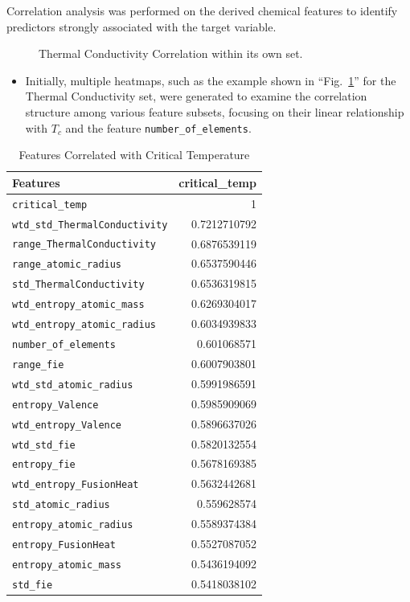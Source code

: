 \documentclass[conference]{IEEEtran}
\begin{document}
Correlation analysis was performed on the derived chemical features to identify predictors strongly associated with the target variable.
\begin{figure}[htbp]
	\centerline{}
	\caption{Thermal Conductivity Correlation within its own set.}
	\label{ThcCorr}
\end{figure}
\begin{itemize}
	\item Initially, multiple heatmaps, such as the example shown in ``Fig.~\ref{ThcCorr}'' for the Thermal Conductivity set, were generated to examine the correlation structure among various feature subsets, focusing on their linear relationship with $T_c$ and the feature \texttt{number\_of\_elements}.
\end{itemize}
\begin{table}[h]
	\centering
	\caption{Features Correlated with Critical Temperature}
	\label{WhlCorr}
	\begin{tabular}{|l|r|}
		\hline
		\textbf{Features} & \textbf{critical\_temp} \\
		\hline
		\texttt{critical\_temp} & 1 \\
		\texttt{wtd\_std\_ThermalConductivity} & 0.7212710792 \\
		\texttt{range\_ThermalConductivity} & 0.6876539119 \\
		\texttt{range\_atomic\_radius} & 0.6537590446 \\
		\texttt{std\_ThermalConductivity} & 0.6536319815 \\
		\texttt{wtd\_entropy\_atomic\_mass} & 0.6269304017 \\
		\texttt{wtd\_entropy\_atomic\_radius} & 0.6034939833 \\
		\texttt{number\_of\_elements} & 0.601068571 \\
		\texttt{range\_fie} & 0.6007903801 \\
		\texttt{wtd\_std\_atomic\_radius} & 0.5991986591 \\
		\texttt{entropy\_Valence} & 0.5985909069 \\
		\texttt{wtd\_entropy\_Valence} & 0.5896637026 \\
		\texttt{wtd\_std\_fie} & 0.5820132554 \\
		\texttt{entropy\_fie} & 0.5678169385 \\
		\texttt{wtd\_entropy\_FusionHeat} & 0.5632442681 \\
		\texttt{std\_atomic\_radius} & 0.559628574 \\
		\texttt{entropy\_atomic\_radius} & 0.5589374384 \\
		\texttt{entropy\_FusionHeat} & 0.5527087052 \\
		\texttt{entropy\_atomic\_mass} & 0.5436194092 \\
		\texttt{std\_fie} & 0.5418038102 \\
		\hline
	\end{tabular}
\end{table}
\end{document}

